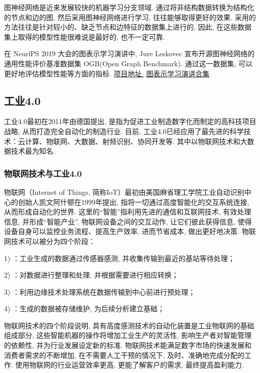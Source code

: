 图神经网络是近来发展较快的机器学习分支领域. 通过将非结构数据转换为结构化的节点和边的图, 然后采用图神经网络进行学习, 往往能够取得更好的效果.
采用的方法往往是针对较小的、缺乏节点和边特征的数据集上进行的, 因此, 在这些数据集上取得的模型性能很难说是最好的, 也不一定可靠.

在 NeurlPS 2019 大会的图表示学习演讲中, Jure Leskovec 宣布开源图神经网络的通用性能评价基准数据集 OGB(Open Graph Benchmark). 通过这一数据集, 可以更好地评估模型性能等方面的指标.
\href{http://ogb.stanford.edu}{项目地址.}  \href{https://slideslive.com/38921872/graph-representation-learning-3}{图表示学习演讲合集}
\subsection{工业4.0}
工业4.0最初在2011年由德国提出, 是指为促进工业制造数字化而制定的高科技项目战略, 从而打造完全自动化的制造行业. 目前, 工业4.0已经应用了最先进的科学技术：云计算、物联网、大数据、射频识别、协同开发等. 其中以物联网技术和大数据技术最为知名.

\subsubsection{物联网技术与工业4.0}

物联网（Internet of Things, 简称IoT）最初由美国麻省理工学院工业自动识别中心的创始人凯文阿什顿在1999年提出, 指将一切通过高度智能化的交互系统连接, 从而形成自动化的世界.
这里的“智能”指利用先进的通信和互联网技术, 有效处理信息, 并形成“智能产业”. 物联网设备之间的交互动作, 让它们彼此获得信息, 使得设备自身可以监控业务流程、提高生产效率, 进而节省成本, 做出更好地决策.
物联网技术可以被分为四个阶段：

1) ：工业生成的数据通过传感器感测, 并收集传输到最近的基站等待处理；

2) ：对数据进行整理和处理, 并根据需要进行相应转换；

3) ：利用边缘技术处理系统在数据传输到中心前进行预处理；

4) ：生成的数据被存储维护, 为后续分析建立基础；

物联网技术的四个阶段说明, 具有高度感测技术的自动化装置是工业物联网的基础组成部分, 这些智能机器的操作将增加工业生产的灵活性, 影响生产者对智能管理的依赖性, 并为行业发展设定新的标准.
物联网技术能满足数字市场的快速发展和消费者需求的不断增加, 在不需要人工干预的情况下, 及时、准确地完成分配的工作. 使用物联网的行业运营效率更高, 更能了解客户的需求, 最终提高盈利能力.
